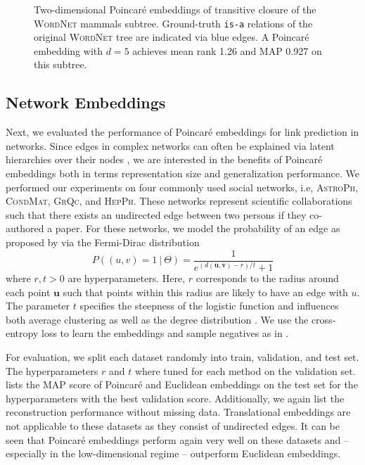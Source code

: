 \documentclass[11pt]{article}
\renewcommand{\vec}[1]{\bm{#1}}
\newcommand{\vu}{\vec{u}}
\newcommand{\vv}{\vec{v}}
\newcommand{\method}[1]{\textsc{#1}\xspace}
\begin{document}
\begin{figure}
\begin{minipage}[b]{0.45\linewidth}
    \label{fig:mammals_converged}
  \end{minipage}
  \caption{Two-dimensional Poincaré embeddings of transitive closure of the \method{WordNet} mammals subtree. Ground-truth \texttt{is-a} relations of the original \method{WordNet} tree are indicated via blue edges.  
  A Poincaré embedding with $d=5$ achieves mean rank 1.26 and MAP 0.927 on this subtree. \label{fig:mammals-viz}}
\end{figure}

\subsection{Network Embeddings}
\label{sec:orgeb02796}
Next, we evaluated the performance of Poincaré embeddings for link prediction in
networks. Since edges in complex networks can often be explained via latent
hierarchies over their nodes \cite{clauset2008hierarchical}, we are interested in the benefits of
Poincaré embeddings both in terms representation size and generalization
performance. We performed our experiments on four commonly used social networks,
i.e, \method{AstroPh}, \method{CondMat}, \method{GrQc}, and \method{HepPh}.
These networks represent scientific collaborations such that there exists an
undirected edge between two persons if they co-authored a paper. For these
networks, we model the probability of an edge as proposed by \citet{hyperbolic/krioukov2010hyperbolic}
via the Fermi-Dirac distribution
\begin{equation}
P((u,v) = 1\ |\ \Theta) = \frac{1}{e^{(d(\vu,\vv) - r)/ t} + 1} \label{eq:fermi}
\end{equation}
where \(r, t > 0\) are hyperparameters. Here, \(r\) corresponds to the
radius around each point \(\vu\) such that points within this radius are likely to
have an edge with \(u\). The parameter \(t\) specifies the steepness of the logistic
function and influences both average clustering as well as the degree
distribution \cite{hyperbolic/krioukov2010hyperbolic}. We use the
cross-entropy loss to learn the embeddings and sample negatives as in
.

For evaluation, we split each dataset randomly into train, validation, and test
set. The hyperparameters \(r\) and \(t\) where tuned for each method on the
validation set.  lists the MAP score of Poincaré and Euclidean
embeddings on the test set for the hyperparameters with the best validation
score. Additionally, we again list the reconstruction performance without
missing data. Translational embeddings are not applicable to these datasets as
they consist of undirected edges. It can be seen that Poincaré embeddings
perform again very well on these datasets and -- especially in the
low-dimensional regime -- outperform Euclidean embeddings.
\end{document}
